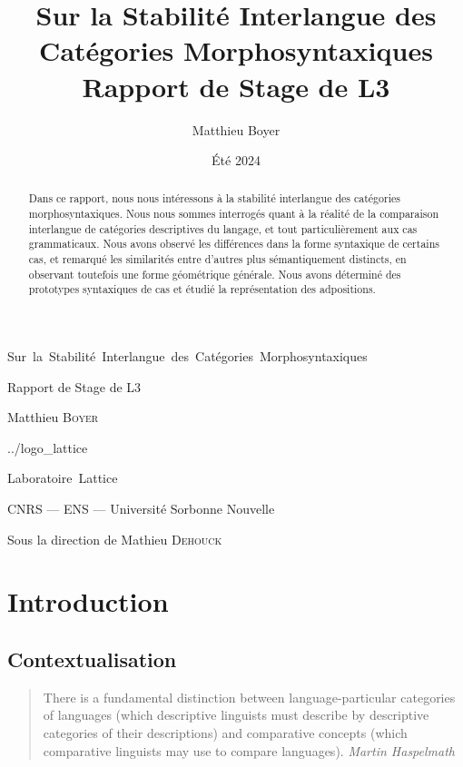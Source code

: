 \documentclass{cours}
\title{Sur la Stabilité Interlangue des Catégories Morphosyntaxiques\\[2pt]\small Rapport de Stage de L3}
\author{Matthieu Boyer}
\date{Été 2024}
\begin{document}
\titlepage %
	{}
        {\centering %
		{\Huge Sur\, la\, Stabilité\, Interlangue\, des\, Catégories\, Morphosyntaxiques\par}
                \vspace{16pt}
                {\Large Rapport de Stage de L3\par}
                \vspace{24pt}
                {\huge Matthieu \textsc{Boyer}\par}}
	{../logo_lattice}
	{\centering %
                {\huge\sc Laboratoire\, Lattice \par}
                \vspace{16pt}
                {\large \sc CNRS --- ENS --- Université Sorbonne Nouvelle\par}
                \vspace{24pt}
		{\Large Sous la direction de Mathieu \textsc{Dehouck}\par}}

\tableofcontents

\begin{abstract}
Dans ce rapport, nous nous intéressons à la stabilité interlangue des catégories morphosyntaxiques.
Nous nous sommes interrogés quant à la réalité de la comparaison interlangue de catégories descriptives du langage, et tout particulièrement aux cas grammaticaux.
Nous avons observé les différences dans la forme syntaxique de certains cas, et remarqué les similarités entre d'autres plus sémantiquement distincts, en observant toutefois une forme géométrique générale.
Nous avons déterminé des prototypes syntaxiques de cas et étudié la représentation des adpositions.
\end{abstract}


\section{Introduction}\label{sec:introduction}
\subsection{Contextualisation}\label{subsec:contextualisation}
\begin{quote}
	There is a fundamental distinction between language-particular categories of languages (which descriptive linguists must describe by descriptive categories of their descriptions) and comparative concepts (which comparative linguists may use to compare languages).
	{\flushright \textit{Martin Haspelmath} \cite{Has18}}
\end{quote}
\end{document}
